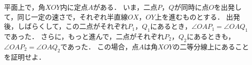 \documentclass[../../main.tex]{subfiles}
\begin{document}
平面上で，角$XOY$内に定点$A$がある．
いま，二点$P$，$Q$が同時に点$O$を出発して，同じ一定の速さで，それぞれ半直線$OX$，$OY$上を進むものとする．
出発後，しばらくして，この二点がそれぞれ$P_1$，$Q_1$にあるとき，$\angle OAP_1 = \angle OAQ_1$であった．
さらに，もっと進んで，二点がそれぞれ$P_2$，$Q_2$にあるときも，$\angle OAP_2 = \angle OAQ_2$であった．
この場合，点$A$は角$XOY$の二等分線上にあることを証明せよ．
\end{document}
